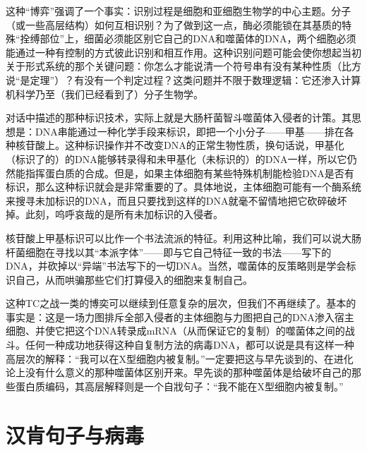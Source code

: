 这种“博弈”强调了一个事实：识别过程是细胞和亚细胞生物学的中心主题。分子（或一些高层结构）如何互相识别？为了做到这一点，酶必须能锁在其基质的特殊“拴缚部位”上，细菌必须能区别它自己的DNA和噬菌体的DNA，两个细胞必须能通过一种有控制的方式彼此识别和相互作用。这种识别问题可能会使你想起当初关于形式系统的那个关键问题：你怎么才能说清一个符号串有没有某种性质（比方说“是定理”）？有没有一个判定过程？这类问题并不限于数理逻辑：它还渗入计算机科学乃至（我们已经看到了）分子生物学。

对话中描述的那种标识技术，实际上就是大肠杆菌智斗噬菌体入侵者的计策。其思想是：DNA串能通过一种化学手段来标识，即把一个小分子——甲基——排在各种核苷酸上。这种标识操作并不改变DNA的正常生物性质，换句话说，甲基化（标识了的）的DNA能够转录得和未甲基化（未标识的）的DNA一样，所以它仍然能指挥蛋白质的合成。但是，如果主体细胞有某些特殊机制能检验DNA是否有标识，那么这种标识就会是非常重要的了。具体地说，主体细胞可能有一个酶系统来搜寻未加标识的DNA，而且只要找到这样的DNA就毫不留情地把它砍碎破坏掉。此刻，呜呼哀哉的是所有未加标识的入侵者。

核苷酸上甲基标识可以比作一个书法流派的特征。利用这种比喻，我们可以说大肠杆菌细胞在寻找以其“本派字体”——即与它自己特征一致的书法——写下的DNA，并砍掉以“异端”书法写下的一切DNA。当然，噬菌体的反策略则是学会标识自己，从而哄骗那些它们打算侵入的细胞来复制自己。

这种TC之战一类的博奕可以继续到任意复杂的层次，但我们不再继续了。基本的事实是：这是一场力图排斥全部入侵者的主体细胞与力图把自己的DNA渗入宿主细胞、并使它把这个DNA转录成mRNA（从而保证它的复制）的噬菌体之间的战斗。任何一种成功地获得这种自复制方法的病毒DNA，都可以说是具有这样一种高层次的解释：“我可以在X型细胞内被复制。”一定要把这与早先谈到的、在进化论上没有什么意义的那种噬菌体区别开来。早先谈的那种噬菌体是给破坏自己的那些蛋白质编码，其高层解释则是一个自戕句子：“我不能在X型细胞内被复制。”

\section{汉肯句子与病毒}

